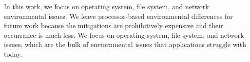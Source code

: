 In this work, we focus on operating system, file system, and network
environmental issues.  We leave processor-based environmental differences
for future work because the mitigations are prohibitively expensive and
their occurrance is much less.  We focus on operating system, file system, 
and network issues, which are the bulk of enviornmental issues that
applications struggle with today.
